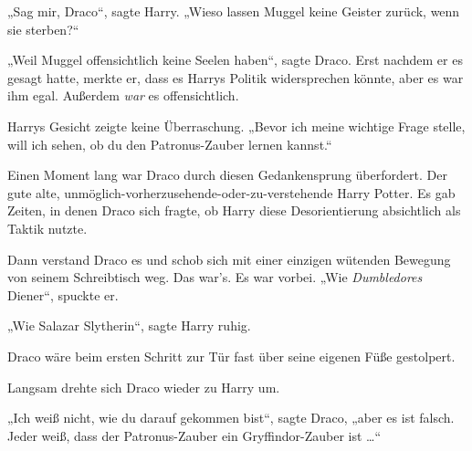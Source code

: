 „Sag mir, Draco“, sagte Harry.
„Wieso lassen Muggel keine Geister zurück, wenn sie sterben?“

„Weil Muggel offensichtlich keine Seelen haben“, sagte Draco. Erst nachdem er es gesagt hatte, merkte er, dass es Harrys Politik widersprechen könnte, aber es war ihm egal. Außerdem \emph{war} es offensichtlich.

Harrys Gesicht zeigte keine Überraschung.
„Bevor ich meine wichtige Frage stelle, will ich sehen, ob du den Patronus-Zauber lernen kannst.“

Einen Moment lang war Draco durch diesen Gedankensprung überfordert. Der gute alte, unmöglich-vorherzusehende-oder-zu-verstehende Harry Potter. Es gab Zeiten, in denen Draco sich fragte, ob Harry diese Desorientierung absichtlich als Taktik nutzte.

Dann verstand Draco es und schob sich mit einer einzigen wütenden Bewegung von seinem Schreibtisch weg. Das war’s. Es war vorbei.
„Wie \emph{Dumbledores} Diener“, spuckte er.

„Wie Salazar Slytherin“, sagte Harry ruhig.

Draco wäre beim ersten Schritt zur Tür fast über seine eigenen Füße gestolpert.

Langsam drehte sich Draco wieder zu Harry um.

„Ich weiß nicht, wie du darauf gekommen bist“, sagte Draco, „aber es ist falsch. Jeder weiß, dass der Patronus-Zauber ein Gryffindor-Zauber ist …“

